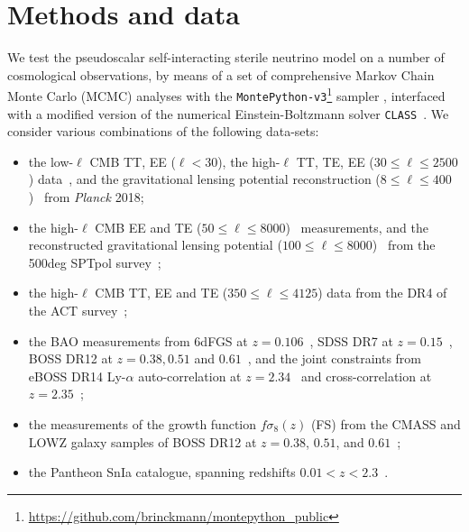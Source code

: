 \documentclass[a4paper,11pt]{article}
\begin{document}
\section{Methods and data}\label{sec:data}

We test the pseudoscalar self-interacting sterile neutrino model on a {number} of cosmological observations, by means of a set of comprehensive {Markov Chain Monte Carlo} (MCMC) analyses with the \texttt{MontePython-v3}\footnote{\url{https://github.com/brinckmann/montepython_public}} sampler \cite{Audren:2012wb,Brinckmann:2018cvx},
interfaced with a modified version of the numerical Einstein-Boltzmann solver \texttt{CLASS}~\cite{Blas:2011rf,Archidiacono:2020yey}.
{We consider} various combinations of the following data-sets:
%
\begin{itemize}
%
\item the low-$\ell$ CMB TT, EE ($ \ell < 30$), the high-$\ell$ TT, TE, EE ($ 30 \leq \ell \leq 2500$) data~\cite{Planck:2018vyg}, and the gravitational lensing potential reconstruction ($ 8 \leq \ell \leq 400$)~\cite{Planck:2018lbu} from {\emph{Planck}} 2018; 
%
\item the high-$\ell$ CMB EE and TE ($50 \leq \ell \leq 8000$)~\cite{Henning:2017nuy} measurements, and the reconstructed gravitational lensing potential ($100 \leq \ell \leq 8000$)~\cite{Bianchini:2019vxp} from the 500deg SPTpol 
survey~\cite{Chudaykin:2020acu};
%
\item the high-$\ell$ CMB TT, EE and TE ($ 350 \leq \ell \leq 4125$) data from the DR4 of the ACT survey~\cite{Aiola:2020azj,Choi:2020ccd};
%
\item the BAO measurements from 6dFGS at $z=0.106$~\cite{Beutler:2011hx}, SDSS DR7 at $z=0.15$~\cite{Ross:2014qpa}, BOSS DR12 at $z=0.38, 0.51$ and $0.61$~\cite{Alam:2016hwk}, and the joint constraints from eBOSS DR14 Ly-$\alpha$ auto-correlation at $z=2.34$~\cite{Agathe:2019vsu} and cross-correlation at $z=2.35$~\cite{Blomqvist:2019rah};
%
\item the measurements of the growth function $f\sigma_8(z)$ (FS) from the CMASS and LOWZ galaxy samples of BOSS DR12 at $z = 0.38$, $0.51$, and $0.61$~\cite{Alam:2016hwk};
%
\item the Pantheon SnIa catalogue, spanning redshifts $0.01 < z < 2.3$~\cite{Scolnic:2018rjj}.
%
\end{itemize}
\end{document}
